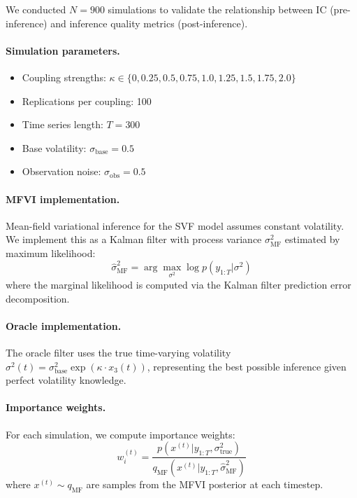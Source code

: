 \documentclass[10pt]{article} %
\theoremstyle{plain}
\theoremstyle{definition}
\begin{document}
We conducted $N = 900$ simulations to validate the relationship between IC (pre-inference) and inference quality metrics (post-inference).

\paragraph{Simulation parameters.}
\begin{itemize}[nosep]
    \item Coupling strengths: $\kappa \in \{0, 0.25, 0.5, 0.75, 1.0, 1.25, 1.5, 1.75, 2.0\}$
    \item Replications per coupling: 100
    \item Time series length: $T = 300$
    \item Base volatility: $\sigma_{\text{base}} = 0.5$
    \item Observation noise: $\sigma_{\text{obs}} = 0.5$
\end{itemize}

\paragraph{MFVI implementation.} Mean-field variational inference for the SVF model assumes constant volatility. We implement this as a Kalman filter with process variance $\sigma^2_{\text{MF}}$ estimated by maximum likelihood:
\begin{equation}
\hat{\sigma}^2_{\text{MF}} = \arg\max_{\sigma^2} \log p(y_{1:T} | \sigma^2)
\end{equation}
where the marginal likelihood is computed via the Kalman filter prediction error decomposition.

\paragraph{Oracle implementation.} The oracle filter uses the true time-varying volatility $\sigma^2(t) = \sigma^2_{\text{base}} \exp(\kappa \cdot x_3(t))$, representing the best possible inference given perfect volatility knowledge.

\paragraph{Importance weights.} For each simulation, we compute importance weights:
\begin{equation}
w_i^{(t)} = \frac{p(x^{(t)} | y_{1:T}, \sigma^2_{\text{true}})}{q_{\text{MF}}(x^{(t)} | y_{1:T}, \hat{\sigma}^2_{\text{MF}})}
\end{equation}
where $x^{(t)} \sim q_{\text{MF}}$ are samples from the MFVI posterior at each timestep.
\end{document}
